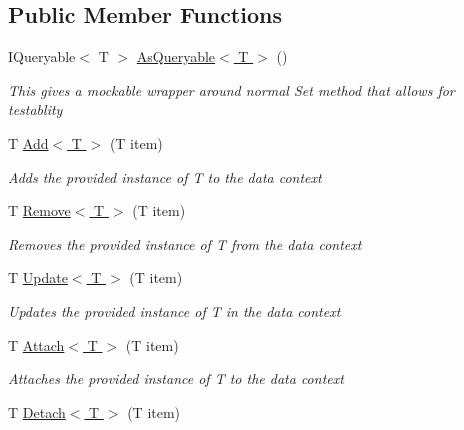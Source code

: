 \subsection*{Public Member Functions}
\begin{DoxyCompactItemize}
\item 
I\-Queryable$<$ T $>$ \hyperlink{interface_highway_1_1_data_1_1_interfaces_1_1_i_data_context_a2361aaf5d4e2635081a51c2244c841e8}{As\-Queryable$<$ T $>$} ()
\begin{DoxyCompactList}\small\item\em This gives a mockable wrapper around normal Set method that allows for testablity \end{DoxyCompactList}\item 
T \hyperlink{interface_highway_1_1_data_1_1_interfaces_1_1_i_data_context_aa40a195c7208c198ab56f4ddf3e33d27}{Add$<$ T $>$} (T item)
\begin{DoxyCompactList}\small\item\em Adds the provided instance of {\itshape T}  to the data context \end{DoxyCompactList}\item 
T \hyperlink{interface_highway_1_1_data_1_1_interfaces_1_1_i_data_context_a07a2c7548509a6db53dd3da67ff5125d}{Remove$<$ T $>$} (T item)
\begin{DoxyCompactList}\small\item\em Removes the provided instance of {\itshape T}  from the data context \end{DoxyCompactList}\item 
T \hyperlink{interface_highway_1_1_data_1_1_interfaces_1_1_i_data_context_a54acc7026404f8426c0e1efe6accaf26}{Update$<$ T $>$} (T item)
\begin{DoxyCompactList}\small\item\em Updates the provided instance of {\itshape T}  in the data context \end{DoxyCompactList}\item 
T \hyperlink{interface_highway_1_1_data_1_1_interfaces_1_1_i_data_context_a404ee46e3152c5a80a7ad7a999a5f302}{Attach$<$ T $>$} (T item)
\begin{DoxyCompactList}\small\item\em Attaches the provided instance of {\itshape T}  to the data context \end{DoxyCompactList}\item 
T \hyperlink{interface_highway_1_1_data_1_1_interfaces_1_1_i_data_context_a88434616ba2c8b719d31e76554babfc0}{Detach$<$ T $>$} (T item)

\end{DoxyCompactItemize}
